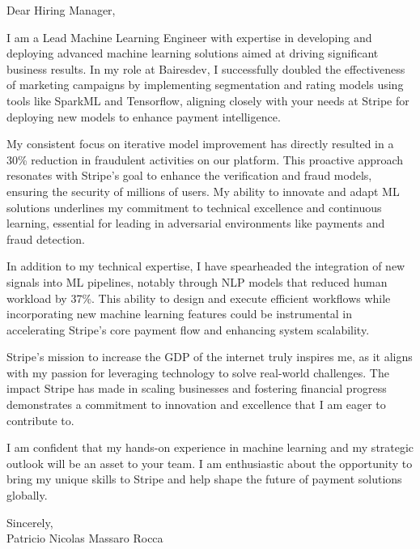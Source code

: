 \documentclass{article}
\begin{document}
\noindent Dear Hiring Manager,


I am a Lead Machine Learning Engineer with expertise in developing and deploying advanced machine learning solutions aimed at driving significant business results. In my role at Bairesdev, I successfully doubled the effectiveness of marketing campaigns by implementing segmentation and rating models using tools like SparkML and Tensorflow, aligning closely with your needs at Stripe for deploying new models to enhance payment intelligence.


My consistent focus on iterative model improvement has directly resulted in a 30\% reduction in fraudulent activities on our platform. This proactive approach resonates with Stripe’s goal to enhance the verification and fraud models, ensuring the security of millions of users. My ability to innovate and adapt ML solutions underlines my commitment to technical excellence and continuous learning, essential for leading in adversarial environments like payments and fraud detection.


In addition to my technical expertise, I have spearheaded the integration of new signals into ML pipelines, notably through NLP models that reduced human workload by 37\%. This ability to design and execute efficient workflows while incorporating new machine learning features could be instrumental in accelerating Stripe’s core payment flow and enhancing system scalability.


Stripe's mission to increase the GDP of the internet truly inspires me, as it aligns with my passion for leveraging technology to solve real-world challenges. The impact Stripe has made in scaling businesses and fostering financial progress demonstrates a commitment to innovation and excellence that I am eager to contribute to.


I am confident that my hands-on experience in machine learning and my strategic outlook will be an asset to your team. I am enthusiastic about the opportunity to bring my unique skills to Stripe and help shape the future of payment solutions globally.

\vspace{1cm}
\setlength{\parskip}{0em}
\begin{flushright}
Sincerely,\\
Patricio Nicolas Massaro Rocca
\end{flushright}
\end{document}
